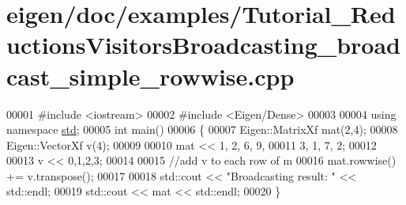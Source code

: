 \hypertarget{eigen_2doc_2examples_2_tutorial___reductions_visitors_broadcasting__broadcast__simple__rowwise_8cpp_source}{}\section{eigen/doc/examples/\+Tutorial\+\_\+\+Reductions\+Visitors\+Broadcasting\+\_\+broadcast\+\_\+simple\+\_\+rowwise.cpp}
\label{eigen_2doc_2examples_2_tutorial___reductions_visitors_broadcasting__broadcast__simple__rowwise_8cpp_source}

\begin{DoxyCode}
00001 \textcolor{preprocessor}{#include <iostream>}
00002 \textcolor{preprocessor}{#include <Eigen/Dense>}
00003 
00004 \textcolor{keyword}{using namespace }\hyperlink{namespacestd}{std};
00005 \textcolor{keywordtype}{int} main()
00006 \{
00007   Eigen::MatrixXf mat(2,4);
00008   Eigen::VectorXf v(4);
00009   
00010   mat << 1, 2, 6, 9,
00011          3, 1, 7, 2;
00012          
00013   v << 0,1,2,3;
00014        
00015   \textcolor{comment}{//add v to each row of m}
00016   mat.rowwise() += v.transpose();
00017   
00018   std::cout << \textcolor{stringliteral}{"Broadcasting result: "} << std::endl;
00019   std::cout << mat << std::endl;
00020 \}
\end{DoxyCode}
